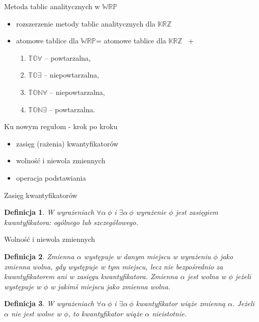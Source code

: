 \documentclass{beamer}
\newtheorem{definicja}{Definicja}
\newcommand {\KRZ} {\ensuremath{\mathbb{KRZ}}}
\newcommand {\WRP} {\ensuremath{\mathbb{WRP}}}
\begin{document}
\begin{frame}{Metoda tablic analitycznych w \WRP}
%
\begin{itemize}
\item rozszerzenie metody tablic analitycznych dla \KRZ
%
\item atomowe tablice dla \WRP = atomowe tablice  dla \KRZ~ +
%
\begin{enumerate}
\item $\mathbb{TO} \forall$ -- powtarzalna,
\item $\mathbb{TO}\exists$ -- niepowtarzalna,
\item $\mathbb{TON}\forall$ -- niepowtarzalna,
\item $\mathbb{TON}\exists$ -- powtarzalna.
\end{enumerate}
\end{itemize}
\end{frame}

\begin{frame}{Ku nowym regułom - krok po kroku}
%
\begin{itemize}
\item zasięg (rażenia) kwantyfikatorów
\item wolność i niewola zmiennych
\item operacja podstawiania
\end{itemize}
\end{frame}

\begin{frame}{Zasięg kwantyfikatorów}
%
\begin{definicja}
\label{zasieg}
W wyrażeniach $\forall \alpha~\phi$ i $\exists \alpha~\phi$ wyrażenie $\phi$ jest \emph{zasięgiem} kwantyfikatora: ogólnego lub szczegółowego.
\end{definicja}
\end{frame}


\begin{frame}{Wolność i niewola zmiennych}
%
\begin{definicja}
\label{wolnosc}
Zmienna $\alpha$ występuje w danym miejscu w wyrażeniu $\phi$ \emph{jako zmienna wolna}, gdy występuje w tym miejscu, lecz nie bezpośrednio za kwantyfikatorem ani w zasięgu kwantyfikatora. Zmienna $\alpha$\emph{ jest wolna} w $\phi$ jeżeli występuje w $\phi$ w jakimś miejscu jako zmienna wolna.
\end{definicja}
%
\begin{definicja}
W wyrażeniach $\forall \alpha~\phi$ i $\exists \alpha~\phi$ kwantyfikator \emph{wiąże} zmienną $\alpha$. Jeżeli $\alpha$ nie jest wolne w $\phi$, to kwantyfikator wiąże $\alpha$ \emph{nieistotnie}.
\end{definicja}
\end{frame}
\end{document}
